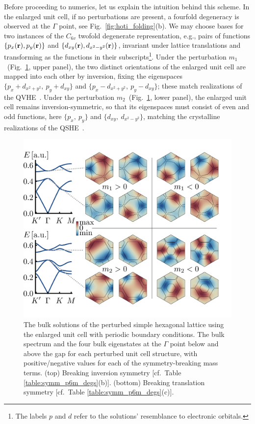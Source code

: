 Before proceeding to numerics, let us explain the intuition behind this scheme. In the enlarged unit cell, if no perturbations are present, a fourfold degeneracy is observed at the $\Gamma$ point, see Fig.~\ref{fig:hoti_folding}(b). We may choose bases for two instances of the $C_{6v}$ twofold degenerate representation, e.g., pairs of functions $\{p_x(\vb{r}), p_y(\vb{r} )\}$ and $\{d_{xy}(\vb{r}), d_{x^2-y^2}(\vb{r})\}$, invariant under lattice translations and transforming as the functions in their subscripts\footnote{The labels $p$ and $d$ refer to the solutions' resemblance to electronic orbitals.}. Under the perturbation $m_1$~(Fig.~\ref{fig:hoti_bulk_sols}, upper panel), the two distinct orientations of the enlarged unit cell are mapped into each other by inversion, fixing the eigenspaces $\{p_x + d_{x^2+y^2}, \: p_y + d_{xy}\}$ and $\{p_x - d_{x^2+y^2}, \: p_y - d_{xy}\}$; these match realizations of the QVHE~\cite{Ma_2016, Lu_2017}. Under the perturbation $m_2$~(Fig.~\ref{fig:hoti_bulk_sols}, lower panel), the enlarged unit cell remains inversion-symmetric, so that its eigenspaces must consist of even and odd functions, here $\{p_x,\: p_y\}$ and $\{d_{xy},\: d_{x^2-y^2}\}$, matching the crystalline realizations of the QSHE~\cite{Wu_Hu_2015}. 

\begin{figure} [h!]
 	\centering
 	\hspace*{-5mm}
 	\includegraphics{figures/hoti/fig2.png}
 	\caption{The bulk solutions of the perturbed simple hexagonal lattice using the enlarged unit cell with periodic boundary conditions. The bulk spectrum and the four bulk eigenstates at the $\Gamma$ point below and above the gap for each perturbed unit cell structure, with positive/negative values for each of the symmetry-breaking mass terms. (top) Breaking inversion symmetry [cf.~Table \ref{table:symm_p6m_degs}(b)]. (bottom) Breaking translation symmetry [cf.~Table \ref{table:symm_p6m_degs}(c)].}
 	\label{fig:hoti_bulk_sols}
\end{figure}

